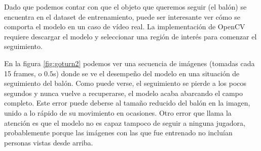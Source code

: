 Dado que podemos contar con que el objeto que queremos seguir (el balón) se encuentra en el dataset de entrenamiento, puede ser interesante ver cómo se comporta el modelo en un caso de vídeo real. La implementación de OpenCV requiere descargar el modelo y seleccionar una región de interés para comenzar el seguimiento.

En la figura \ref{fig:goturn2} podemos ver una secuencia de imágenes (tomadas cada 15 frames, o $0.5$s) donde se ve el desempeño del modelo en una situación de seguimiento del balón. Como puede verse, el seguimiento se pierde a los pocos segundos y nunca vuelve a recuperarse, el modelo acaba abarcando el campo completo. Este error puede deberse al tamaño reducido del balón en la imagen, unido a lo rápido de su movimiento en ocasiones. Otro error que llama la atención es que el modelo no es capaz tampoco de seguir a ninguna jugadora, probablemente porque las imágenes con las que fue entrenado no incluían personas vistas desde arriba.

